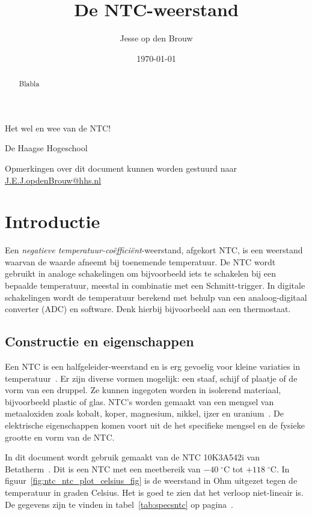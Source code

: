 \documentclass[12pt,a4paper,final,twoside,fleqn]{article}
\author{Jesse op den Brouw}
\title{De NTC-weerstand}
\date{\today}
\makeatletter
\def\maketitle{%
  \null
  \thispagestyle{empty}%
  \vskip 3cm
  \begin{center}\leavevmode
    {\LARGE \@title\par}%
    {\large \subtitle\par}%
    \vskip 1cm
    {\large \@author\par}%
    \vskip 0.03cm
    {\large De Haagse Hogeschool\par}%
    \vskip 0.03cm
    {\large \@date\par}%
  \end{center}%
  \vfill
  \null
}
\newcommand{\subtitle}{Het wel en wee van de NTC!}
\newcommand{\mathcelc}[1]{\mbox{$#1\;^\circ\text{C}$}}
\newcommand{\ntctype}{10K3A542i}
\newcommand{\ntcman}{Betatherm}
\makeatother
\begin{document}
\raggedbottom

\maketitle
\begin{abstract}
\noindent
Blabla
\end{abstract}
\vspace*{2cm}

\clearpage
\tableofcontents
\clearpage
\listoffigures
\vspace{1cm}
\lstlistoflistings
\vfill
{\small
Opmerkingen over dit document kunnen worden gestuurd naar
\href{mailto:J.E.J.opdenBrouw@hhs.nl}{J.E.J.opdenBrouw@hhs.nl}
}
\clearpage


\section{Introductie}
Een \textsl{negatieve temperatuur-co\"effici\"ent}-weerstand, afgekort NTC,
is een weerstand waarvan de waarde afneemt bij toenemende temperatuur. De
NTC wordt gebruikt in analoge schakelingen om bijvoorbeeld iets te schakelen
bij een bepaalde temperatuur, meestal in combinatie met een Schmitt-trigger.
In digitale schakelingen wordt de temperatuur berekend met behulp van een
analoog-digitaal converter (ADC) en software. Denk hierbij bijvoorbeeld aan
een thermostaat. 
\subsection{Constructie en eigenschappen}
Een NTC is een halfgeleider-weerstand en is erg gevoelig voor kleine variaties
in temperatuur~\cite{jespersen1982thermal}. Er zijn diverse vormen mogelijk:
een staaf, schijf of plaatje of de vorm van een druppel. Ze kunnen ingegoten
worden in isolerend materiaal, bijvoorbeeld plastic of glas.
NTC's worden gemaakt van een mengsel van metaaloxiden zoals kobalt, koper,
magnesium, nikkel, ijzer en uranium~\cite{bakshi2009basic}. De elektrische
eigenschappen komen voort uit de het specifieke mengsel en de fysieke grootte
en vorm van de NTC.





In dit document wordt gebruik gemaakt van de NTC \ntctype{} van
\ntcman~\cite{betatherm10K3A542i}. Dit is een NTC met een meetbereik van
\mathcelc{-40} tot \mathcelc{+118}. In figuur~\ref{fig:ntc_ntc_plot_celsius_fig} is
de weerstand in Ohm uitgezet tegen de temperatuur in graden Celsius. Het is goed
te zien dat het verloop niet-lineair is. De gegevens
zijn te vinden in tabel~\ref{tab:specsntc} op pagina~\pageref{tab:specsntc}.
\end{document}

